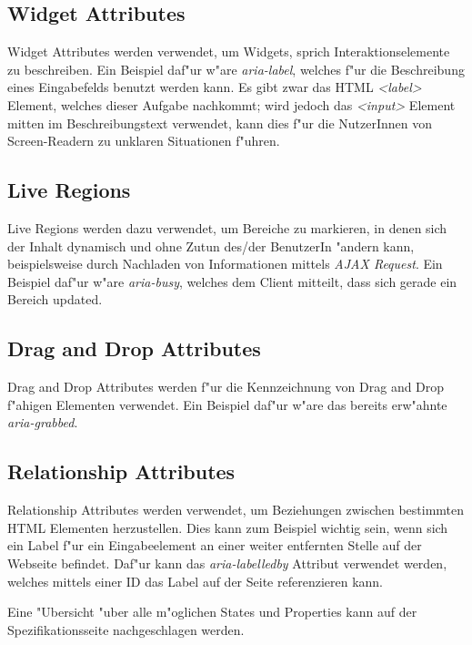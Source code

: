 \documentclass[a4paper,bibtotoc,oneside]{scrbook}
\begin{document}
\subsection{Widget Attributes}
Widget Attributes werden verwendet, um Widgets, sprich Interaktionselemente zu beschreiben. Ein Beispiel daf"ur w"are \emph{aria-label}, welches f"ur die Beschreibung eines Eingabefelds benutzt werden kann. Es gibt zwar das HTML \emph{<label>} Element, welches dieser Aufgabe nachkommt; wird jedoch das \emph{<input>} Element mitten im Beschreibungstext verwendet, kann dies f"ur die NutzerInnen von Screen-Readern zu unklaren Situationen f"uhren. \cite[Abschnitt 6.6, aria-label]{aria_states}

\subsection{Live Regions}
Live Regions werden dazu verwendet, um Bereiche zu markieren, in denen sich der Inhalt dynamisch und ohne Zutun des/der BenutzerIn "andern kann, beispielsweise durch Nachladen von Informationen mittels \emph{AJAX Request}. Ein Beispiel daf"ur w"are \emph{aria-busy}, welches dem Client mitteilt, dass sich gerade ein Bereich updated. \cite[Abschnitt 6.6, aria-busy]{aria_states}

\subsection{Drag and Drop Attributes}
Drag and Drop Attributes werden f"ur die Kennzeichnung von Drag and Drop f"ahigen Elementen verwendet. Ein Beispiel daf"ur w"are das bereits erw"ahnte \emph{aria-grabbed}. \cite[Abschnitt 6.6, aria-grabbed]{aria_states}

\subsection{Relationship Attributes}
Relationship Attributes werden verwendet, um Beziehungen zwischen bestimmten HTML Elementen herzustellen. Dies kann zum Beispiel wichtig sein, wenn sich ein Label f"ur ein Eingabeelement an einer weiter entfernten Stelle auf der Webseite befindet. Daf"ur kann das \emph{aria-labelledby} Attribut verwendet werden, welches mittels einer ID das Label auf der Seite referenzieren kann. \cite[Abschnitt 6.6, aria-labelledby]{aria_states}

Eine "Ubersicht "uber alle m"oglichen States und Properties kann auf der Spezifikationsseite nachgeschlagen werden. \cite[Abschnitt 6.6]{aria_states}
\end{document}
